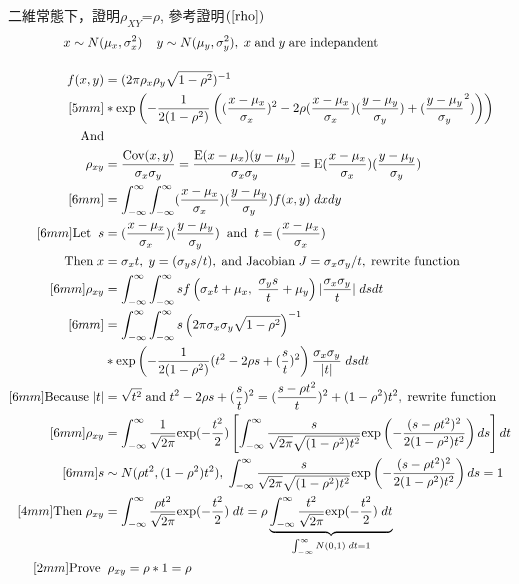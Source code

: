 \newpage
 \begin{try}二維常態下，證明$\rho_{XY}$=$\rho$, 參考證明$(\ref{rho})$
\begin{align}\label{rho}
x \sim N(&\mu_{x}, \sigma_{x}^2)\;\;\;\;y \sim N(\mu_{y}, \sigma_{y}^2),\; x\;\mbox{and}\;y \;\mbox{are indepandent}\notag\\[4mm]
f(x, y)&=(2\pi\rho_{x}\rho_{y}\sqrt{1-\rho^2})^{-1}\notag\\\notag[5mm]
&*\mbox{exp}\left(-\frac{1}{2(1-\rho^2)}\left(
(\frac{x-\mu_{x}}{\sigma_{x}})^2-2\rho(\frac{x-\mu_{x}}{\sigma_{x}})(\frac{y-\mu_{y}}{\sigma_{y}})+(\frac{y-\mu_{y}}{\sigma_{y}}^2)\right)\right)\\\notag
\mbox{And} & \\\notag
\rho_{xy} &= \frac{\mbox{Cov}(x, y)}{\sigma_{x}\sigma_{y}}=\frac{\mbox{E}(x-\mu_{x})(y-\mu_{y})}{\sigma_{x}\sigma_{y}}=\mbox{E}(\frac{x-\mu_{x}}{\sigma_{x}})(\frac{y-\mu_{y}}{\sigma_{y}})\\\notag[6mm]
&=\int_{-\infty}^{\infty}\int_{-\infty}^{\infty}(\frac{x-\mu_{x}}{\sigma_{x}})(\frac{y-\mu_{y}}{\sigma_{y}})f(x, y)\;dxdy\\\notag[6mm]
\mbox{Let} \;\;s &=(\frac{x-\mu_{x}}{\sigma_{x}})(\frac{y-\mu_{y}}{\sigma_{y}})\;\;\mbox{and} \;\; t=(\frac{x-\mu_{x}}{\sigma_{x}})\\\notag
\mbox{Then} \; x &=\sigma_{x}t, \; y=(\sigma_{y}s/t), \; \mbox{and Jacobian}\; J=\sigma_{x}\sigma_{y}/t,\; \mbox{rewrite function}\\\notag[6mm]
\rho_{xy}&=\int_{-\infty}^{\infty}\int_{-\infty}^{\infty}sf\left(\sigma_{x}t+\mu_{x},\;\frac{\sigma_{y}s}{t}+\mu_{y}\right)\vert\frac{\sigma_{x}\sigma_{y}}{t}\vert \;dsdt\\\notag[6mm]
&=\int_{-\infty}^{\infty}\int_{-\infty}^{\infty}s\left(2\pi\sigma_{x}\sigma_{y}\sqrt{1-\rho^2}\right)^{-1}\\
&*\mbox{exp}\left(-\frac{1}{2(1-\rho^2)}(t^2-2\rho s+(\frac{s}{t})^2\right)\frac{\sigma_{x}\sigma_{y}}{\vert t\vert} \;dsdt\\\notag[6mm]
\mbox{Because}\;\vert t\vert &=\sqrt{t^2}\;\mbox{and}\; t^2-2\rho s+(\frac{s}{t})^2=(\frac{s-\rho t^2}{t})^2+(1-\rho^2)t^2,\; \mbox{rewrite function}\\\notag[6mm]
\rho_{xy} &= \int_{-\infty}^{\infty}\frac{1}{\sqrt{2\pi}}\mbox{exp}(-\frac{t^2}{2})\left[\int_{-\infty}^{\infty}\frac{s}{\sqrt{2\pi}\sqrt{(1-\rho^2)t^2}}\mbox{exp}\left(-\frac{(s-\rho t^2)^2}{2(1-\rho^2)t^2}\right)ds\right]dt\\\notag[6mm]
s &\sim N(\rho t^2, (1-\rho^2)t^2),\;\int_{-\infty}^{\infty}\frac{s}{\sqrt{2\pi}\sqrt{(1-\rho^2)t^2}}\mbox{exp}\left(-\frac{(s-\rho t^2)^2}{2(1-\rho^2)t^2}\right)ds=1\\\notag[4mm]
\mbox{Then}\; \rho_{xy} &=\int_{-\infty}^{\infty}\frac{\rho t^2}{\sqrt{2\pi}}\mbox{exp}(-\frac{t^2}{2})\; dt=\rho \underbrace{\int_{-\infty}^{\infty}\frac{t^2}{\sqrt{2\pi}}\mbox{exp}(-\frac{t^2}{2})\; dt}_{\int_{-\infty}^{\infty}N(0,1)\;dt=1}\\\notag[2mm]
\mbox{Prove} \;&\;\rho_{xy}=\rho*1=\rho\\\notag
\end{align} 
\end{try}\newpage
